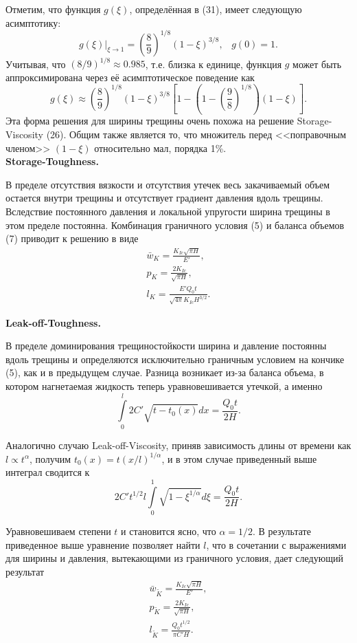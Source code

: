 \documentclass[a4paper, 12pt]{article}
\newcommand{\beq}{\begin{equation}}
\newcommand{\eeq}{\end{equation}}
\begin{document}
Отметим, что функция $g(\xi)$, определённая в (31), имеет следующую асимптотику:
\beq
g(\xi)|_{\xi\to1}=\left(\frac{8}{9}\right)^{1/8}\left(1-\xi\right)^{3/8},\,\,\,\,\,g(0)=1.
\eeq
Учитывая, что $(8/9)^{1/8}\approx0.985$, т.е. близка к единице, функция $g$ может быть аппроксимирована через её асимптотическое поведение как
\beq
g(\xi)\approx\left(\frac{8}{9}\right)^{1/8}\left(1-\xi\right)^{3/8}\left[1-\left(1-\left(\frac{9}{8}\right)^{1/8}\right)\left(1-\xi\right)\right].
\eeq
Эта форма решения для ширины трещины очень похожа на решение Storage-Viscosity (26).
Общим также является то, что множитель перед <<поправочным членом>> $\left(1-\xi\right)$  относительно мал, порядка 1\%.\\

\textbf{Storage-Toughness.}

В пределе отсутствия вязкости и отсутствия утечек весь закачиваемый объем остается внутри трещины и отсутствует градиент давления вдоль трещины.
Вследствие постоянного давления и локальной упругости ширина трещины в этом пределе постоянна.
Комбинация граничного условия (5) и баланса объемов (7) приводит к решению в виде
\beq
\begin{gathered}
\bar{w}_K=\frac{K_{Ic}\sqrt{\pi H}}{E'},\\
p_K=\frac{2K_{Ic}}{\sqrt{\pi H}},\\
l_K=\frac{E'Q_0t}{\sqrt{4\pi}K_{Ic}H^{3/2}}.
\end{gathered}
\eeq

\textbf{Leak-off-Toughness.}

В пределе доминирования трещиностойкости ширина и давление постоянны вдоль трещины и определяются исключительно граничным условием на кончике (5), как и в предыдущем случае.
Разница возникает из-за баланса объема, в котором нагнетаемая жидкость теперь уравновешивается утечкой, а именно
\beq
\int\limits_{0}^{l}{2C'\sqrt{t-t_0(x)}dx}=\frac{Q_0t}{2H}.
\eeq

Аналогично случаю Leak-off-Viscosity, приняв зависимость длины от времени как $l\propto t^{\alpha}$, получим $t_0(x)=t(x/l)^{1/\alpha}$, и в этом случае приведенный выше интеграл сводится к
\beq
2C't^{1/2}l\int\limits_{0}^{1}{\sqrt{1-\xi^{1/\alpha}}d\xi}=\frac{Q_0t}{2H}.
\eeq

Уравновешиваем степени $t$ и становится ясно, что $\alpha=1/2$.
В результате приведенное выше уравнение позволяет найти $l$, что в сочетании с выражениями для ширины и давления, вытекающими из граничного условия, дает следующий результат
\beq
\begin{gathered}
\bar{w}_{\tilde{K}}=\frac{K_{Ic}\sqrt{\pi H}}{E'},\\
p_{\tilde{K}}=\frac{2K_{Ic}}{\sqrt{\pi H}},\\
l_{\tilde{K}}=\frac{Q_0t^{1/2}}{\pi C' H}.
\end{gathered}
\eeq
\end{document}
